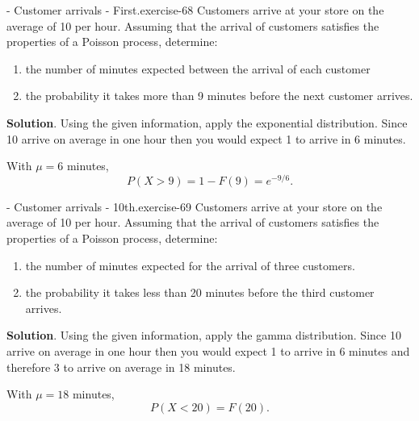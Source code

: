 \documentclass[10pt,]{book}
\numberwithin{equation}{section}
\newcommand{\lt}{<}
\newcommand{\gt}{>}
\begin{document}
%
\par
\hypertarget{p-1004}{}%
\begin{inlineexercise}{- Customer arrivals - First.}{exercise-68}%
\hypertarget{p-1005}{}%
Customers arrive at your store on the average of 10 per hour.  Assuming that the arrival of customers satisfies the properties of a Poisson process, determine: \leavevmode%
\begin{enumerate}
\item\hypertarget{li-301}{}the number of minutes expected between the arrival of each customer%
\item\hypertarget{li-302}{}the probability it takes more than 9 minutes before the next customer arrives.%
\end{enumerate}
 \textbf{Solution}.\quad%
\hypertarget{p-1006}{}%
Using the given information, apply the exponential distribution.  Since 10 arrive on average in one hour then you would expect 1 to arrive in 6 minutes.%
\par
\hypertarget{p-1007}{}%
With \(\mu = 6\) minutes,%
\begin{equation*}
P(X \gt 9) = 1 - F(9) = e^{-9/6}.
\end{equation*}
%
%
\end{inlineexercise}
%
\par
\hypertarget{p-1008}{}%
\begin{inlineexercise}{- Customer arrivals - 10th.}{exercise-69}%
\hypertarget{p-1009}{}%
Customers arrive at your store on the average of 10 per hour.  Assuming that the arrival of customers satisfies the properties of a Poisson process, determine: \leavevmode%
\begin{enumerate}
\item\hypertarget{li-303}{}the number of minutes expected for the arrival of three customers.%
\item\hypertarget{li-304}{}the probability it takes less than 20 minutes before the third customer arrives.%
\end{enumerate}
 \textbf{Solution}.\quad%
\hypertarget{p-1010}{}%
Using the given information, apply the gamma distribution.  Since 10 arrive on average in one hour then you would expect 1 to arrive in 6 minutes and therefore 3 to arrive on average in 18 minutes.%
\par
\hypertarget{p-1011}{}%
With \(\mu = 18\) minutes,%
\begin{equation*}
P(X \lt 20) = F(20).
\end{equation*}
%
%
\end{inlineexercise}
\end{document}
